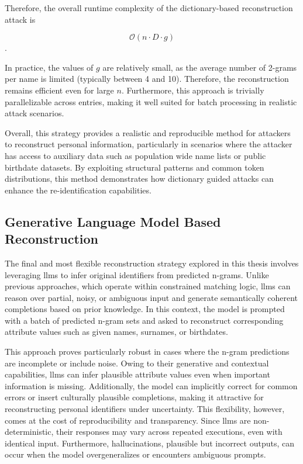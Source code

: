 Therefore, the overall runtime complexity of the dictionary-based reconstruction attack is

\[
\mathcal{O}(n \cdot D \cdot g)
\].


In practice, the values of $g$ are relatively small, as the average number of 2-grams per name is limited (typically between 4 and 10). Therefore, the reconstruction remains efficient even for large $n$. Furthermore, this approach is trivially parallelizable across entries, making it well suited for batch processing in realistic attack scenarios.


Overall, this strategy provides a realistic and reproducible method for attackers to reconstruct personal information, particularly in scenarios where the attacker has access to auxiliary data such as population wide name lists or public birthdate datasets.
By exploiting structural patterns and common token distributions, this method demonstrates how dictionary guided attacks can enhance the re-identification capabilities.

\subsection{Generative Language Model Based Reconstruction}
\label{sec:generative-llm-reconstruction}

The final and most flexible reconstruction strategy explored in this thesis involves leveraging \ac{llm}s to infer original identifiers from predicted n-grams.
Unlike previous approaches, which operate within constrained matching logic, \ac{llm}s can reason over partial, noisy, or ambiguous input and generate semantically coherent completions based on prior knowledge.
In this context, the model is prompted with a batch of predicted n-gram sets and asked to reconstruct corresponding attribute values such as given names, surnames, or birthdates.

This approach proves particularly robust in cases where the n-gram predictions are incomplete or include noise.
Owing to their generative and contextual capabilities, \ac{llm}s can infer plausible attribute values even when important information is missing.
Additionally, the model can implicitly correct for common errors or insert culturally plausible completions, making it attractive for reconstructing personal identifiers under uncertainty.
This flexibility, however, comes at the cost of reproducibility and transparency. Since \ac{llm}s are non-deterministic, their responses may vary across repeated executions, even with identical input.
Furthermore, hallucinations, plausible but incorrect outputs, can occur when the model overgeneralizes or encounters ambiguous prompts.

